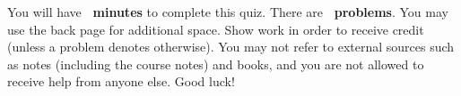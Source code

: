 \begin{tcolorbox}[enhanced,attach boxed title to top center=
	{yshift=-2mm,yshifttext=-1mm},colback=white,colframe=black,colbacktitle=black,title={\textbf{Instructions}}]
	You will have \textbf{\ minutes} to complete this quiz. There are \textbf{\ problems}. You may use the back page for additional space. Show work in order to receive credit (unless a problem denotes otherwise). You may not refer to external sources such as notes (including the course notes) and books, and you are not allowed to receive help from anyone else. Good luck!
\end{tcolorbox}
